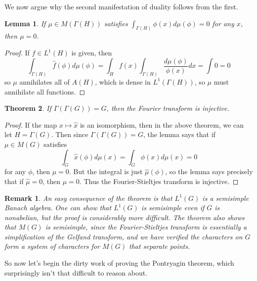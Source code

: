 \documentclass{article}
\theoremstyle{plain}
\newtheorem{theorem}{Theorem}
\newtheorem{lemma}[theorem]{Lemma}
\newtheorem*{remark}{Remark}
\theoremstyle{definition}
\begin{document}
We now argue why the second manifestation of duality follows from the first.

\begin{lemma}
    If $\mu \in M(\Gamma(H))$ satisfies $\int_{\Gamma(H)} \phi(x) d\mu(\phi) = 0$ for any $x$, then $\mu = 0$.
\end{lemma}
\begin{proof}
    If $f \in L^1(H)$ is given, then
    \[ \int_{\Gamma(H)} \widehat{f}(\phi) d\mu(\phi) = \int_H f(x) \int_{\Gamma(H)} \frac{d\mu(\phi)}{\phi(x)} dx = \int 0 = 0 \]
    so $\mu$ annihilates all of $A(H)$, which is dense in $L^1(\Gamma(H))$, so $\mu$ must annihilate all functions.
\end{proof}

\begin{theorem}
    If $\Gamma(\Gamma(G)) = G$, then the Fourier transform is injective.
\end{theorem}
\begin{proof}
    If the map $x \mapsto \widehat{x}$ is an isomorphism, then in the above theorem, we can let $H = \Gamma(G)$. Then since $\Gamma(\Gamma(G)) = G$, the lemma says that if $\mu \in M(G)$ satisfies
    \[ \int_G \widehat{x}(\phi) d\mu(x) = \int_G \phi(x) d\mu(x) = 0 \]
    for any $\phi$, then $\mu = 0$. But the integral is just $\widehat{\mu}(\phi)$, so the lemma says precisely that if $\widehat{\mu} = 0$, then $\mu = 0$. Thus the Fourier-Stieltjes transform is injective.
\end{proof}

\begin{remark}
    An easy consequence of the theorem is that $L^1(G)$ is a semisimple Banach algebra. One can show that $L^1(G)$ is semisimple even if $G$ is nonabelian, but the proof is considerably more difficult. The theorem also shows that $M(G)$ is semisimple, since the Fourier-Stieltjes transform is essentially a simplification of the Gelfand transform, and we have verified the characters on $G$ form a system of characters for $M(G)$ that separate points.
\end{remark}

So now let's begin the dirty work of proving the Pontryagin theorem, which surprisingly isn't that difficult to reason about.
\end{document}
